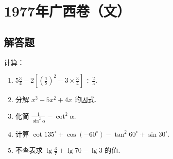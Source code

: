 
\chapter{1977年广西卷（文）}

\section{解答题}

\begin{problem}
计算：

\begin{enumerate}
\item \( 5\frac{3}{4}-2\left[ \left( \frac{1}{2} \right)^2-3\times\frac{3}{4} \right]\div\frac{2}{5} \).
\item 分解 \( x^3-5x^2+4x \) 的因式.
\item 化简 \( \frac{1}{\sin^2 \alpha}-\cot^2 \alpha \).
\item 计算 \( \cot 135^\circ+\cos \left( -60^\circ \right)-\tan^2 60^\circ+\sin 30^\circ \).
\item 不查表求 \(\lg\frac{3}{7}+\lg70-\lg3\) 的值.
\end{enumerate}
\end{problem}


